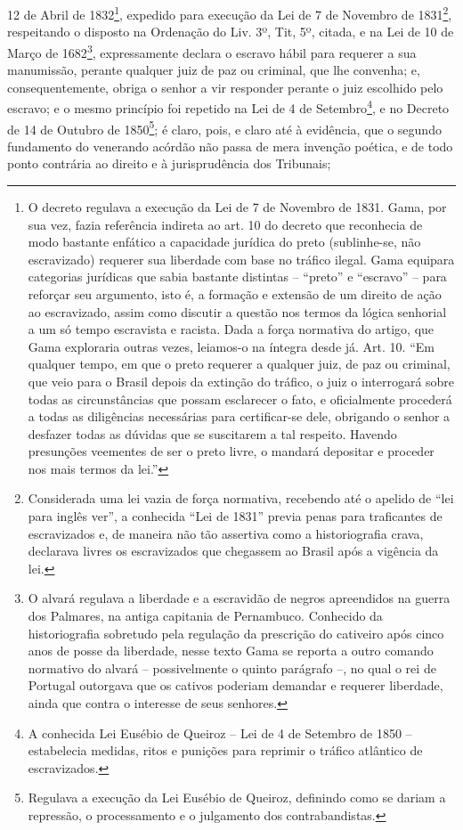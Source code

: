 12 de Abril de 1832\footnote{O decreto regulava a execução da Lei de 7
  de Novembro de 1831. Gama, por sua vez, fazia referência indireta ao
  art. 10 do decreto que reconhecia de modo bastante enfático a
  capacidade jurídica do preto (sublinhe-se, não escravizado) requerer
  sua liberdade com base no tráfico ilegal. Gama equipara categorias
  jurídicas que sabia bastante distintas -- ``preto'' e ``escravo'' --
  para reforçar seu argumento, isto é, a formação e extensão de um
  direito de ação ao escravizado, assim como discutir a questão nos
  termos da lógica senhorial a um só tempo escravista e racista. Dada a
  força normativa do artigo, que Gama exploraria outras vezes, leiamos-o
  na íntegra desde já. Art. 10. ``Em qualquer tempo, em que o preto
  requerer a qualquer juiz, de paz ou criminal, que veio para o Brasil
  depois da extinção do tráfico, o juiz o interrogará sobre todas as
  circunstâncias que possam esclarecer o fato, e oficialmente procederá
  a todas as diligências necessárias para certificar-se dele, obrigando
  o senhor a desfazer todas as dúvidas que se suscitarem a tal respeito.
  Havendo presunções veementes de ser o preto livre, o mandará depositar
  e proceder nos mais termos da lei.''}, expedido para execução da Lei
de 7 de Novembro de 1831\footnote{Considerada uma lei vazia de força
  normativa, recebendo até o apelido de ``lei para inglês ver'', a
  conhecida ``Lei de 1831'' previa penas para traficantes de
  escravizados e, de maneira não tão assertiva como a historiografia
  crava, declarava livres os escravizados que chegassem ao Brasil após a
  vigência da lei.}, respeitando o disposto na Ordenação do Liv. 3º,
Tit, 5º, citada, e na Lei de 10 de Março de 1682\footnote{O alvará
  regulava a liberdade e a escravidão de negros apreendidos na guerra
  dos Palmares, na antiga capitania de Pernambuco. Conhecido da
  historiografia sobretudo pela regulação da prescrição do cativeiro
  após cinco anos de posse da liberdade, nesse texto Gama se reporta a
  outro comando normativo do alvará -- possivelmente o quinto parágrafo
  --, no qual o rei de Portugal outorgava que os cativos poderiam
  demandar e requerer liberdade, ainda que contra o interesse de seus
  senhores.}, expressamente declara o escravo hábil para requerer a sua
manumissão, perante qualquer juiz de paz ou criminal, que lhe convenha;
e, consequentemente, obriga o senhor a vir responder perante o juiz
escolhido pelo escravo; e o mesmo princípio foi repetido na Lei de 4 de
Setembro\footnote{A conhecida Lei Eusébio de Queiroz -- Lei de 4 de
  Setembro de 1850 -- estabelecia medidas, ritos e punições para
  reprimir o tráfico atlântico de escravizados.}, e no Decreto de 14 de
Outubro de 1850\footnote{Regulava a execução da Lei Eusébio de Queiroz,
  definindo como se dariam a repressão, o processamento e o julgamento
  dos contrabandistas.}; é claro, pois, e claro até à evidência, que o
segundo fundamento do venerando acórdão não passa de mera invenção
poética, e de todo ponto contrária ao direito e à jurisprudência dos
Tribunais;

